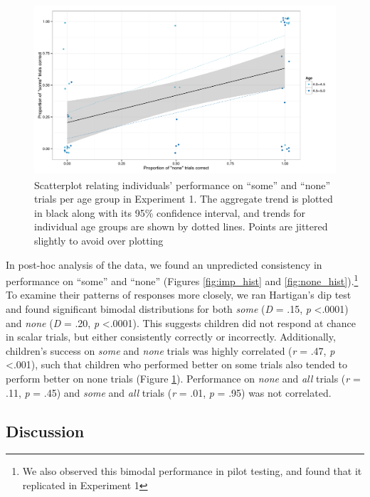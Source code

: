 \documentclass[man]{apa2}
\begin{document}
\begin{figure} 
 \begin{center} 
  \includegraphics[height=2.5in]{figures/exp1_diffs.pdf} 
  \caption{\label{fig:exp1_diffs} Scatterplot relating individuals' performance on ``some'' and ``none'' trials per age group in Experiment 1. The aggregate trend is plotted in black along with its 95\% confidence interval, and trends for individual age groups are shown by dotted lines. Points are jittered slightly to avoid over plotting} 
 \end{center} 
\end{figure}

In post-hoc analysis of the data, we found an unpredicted consistency in performance on ``some'' and ``none'' (Figures \ref{fig:imp_hist} and \ref{fig:none_hist}).\footnote{We also observed this bimodal performance in pilot testing, and found that it replicated in Experiment 1}  To examine their patterns of responses more closely, we ran Hartigan's dip test and found significant bimodal distributions for both \textit{some} (\textit{D} = .15, \textit{p} \textless  .0001) and \textit{none} (\textit{D} = .20, \textit{p} \textless  .0001). This suggests children did not respond at chance in scalar trials, but either consistently correctly or incorrectly. Additionally, children's success on \textit{some} and \textit{none} trials was highly correlated (\textit{r} = .47, \textit{p} \textless  .001), such that children who performed better on some trials also tended to perform better on none trials (Figure \ref{fig:exp1_diffs}).  Performance on \textit{none} and \textit{all} trials (\textit{r} = .11, \textit{p} = .45) and \textit{some} and \textit{all} trials (\textit{r} = .01, \textit{p} = .95) was not correlated. 

\subsection{Discussion}
\end{document}
